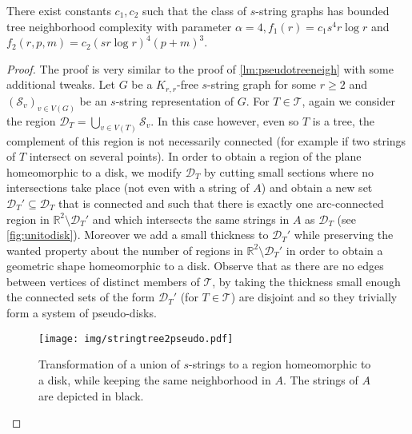 \documentclass{amsart}
\newcommand{\D}{\mathcal{D}} \newcommand{\R}{\mathcal{R}} \newcommand{\C}{\mathcal{C}} \newcommand{\E}{\mathcal{E}}
\newcommand{\mS}{\mathcal{S}}
\newcommand{\mT}{\mathcal{T}}
\newcommand{\f}{f}
\begin{document}
\begin{lemma}\label{lm:sstringtreeneigh}
 There exist constants $c_1,c_2$ such that the class of $s$-string graphs has bounded tree neighborhood complexity with parameter $\alpha=4, \f_1(r)=c_1s^4r\log r$ and $f_2(r,p,m)=c_2(sr\log r)^4(p+m)^3$.
\end{lemma}
\begin{proof}
    The proof is very similar to the proof of \autoref{lm:pseudotreeneigh} with some additional tweaks.
    Let $G$ be a $K_{r,r}$-free $s$-string graph for some $r\geq 2$ and $(\mathcal S_v)_{v\in V(G)}$ be an $s$-string representation of $G$.
For $T\in \mT$, again we consider the region $\D_T = \bigcup_{v\in V(T)}\mS_v$.
In this case however, even so $T$ is a tree, the complement of this region is not necessarily connected (for example if two strings of $T$ intersect on several points).
In order to obtain a region of the plane homeomorphic to a disk, we modify $\D_T$ by cutting small sections  where no intersections take place (not even with a string of $A$) and obtain a new set $\D_T'\subseteq \mathcal D_T$ that is connected and such that there is exactly one arc-connected region in $\mathbb{R}^2\setminus \mathcal D_T'$ and which intersects the same strings in $A$ as $\mathcal D_T$ (see \autoref{fig:unitodisk}).
Moreover we add a small thickness to $\D_T'$ while preserving the wanted property about the number of regions in $\mathbb{R}^2\setminus \mathcal D_T'$ in order to obtain a geometric shape homeomorphic to a disk.
Observe that as there are no edges between vertices of distinct members of $\mT$, by taking the thickness small enough the connected sets of the form $\mathcal D_T'$ (for $T\in \mT$) are disjoint and so they trivially form a system of pseudo-disks.

\begin{figure}[ht]
    \centering
    \texttt{[image: img/stringtree2pseudo.pdf]}
    \caption{Transformation of a union of $s$-strings to a region homeomorphic to a disk, while keeping the same neighborhood in $A$. The strings of $A$ are depicted in black.}
    \label{fig:unitodisk}
\end{figure}


\end{proof}
\end{document}
